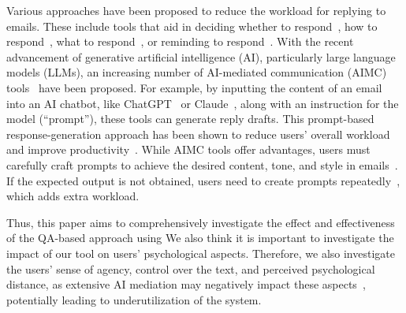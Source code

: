 Various approaches have been proposed to reduce the workload for replying to emails.
These include tools that aid in deciding whether to respond~\cite{dredze2008intelligent, di2016youvegotmail}, how to respond~\cite{vaish2017crowdtone, Respondable}, what to respond~\cite{Kannan2016Smart, Al-Alwani2013novel, Moravapalle2017DejaVuAC, Naeem2018A}, or reminding to respond~\cite{Dugan2017RemindMe:, Won2009Designing}.
With the recent advancement of generative artificial intelligence (AI), particularly large language models (LLMs), an increasing number of AI-mediated communication (AIMC) tools~\cite{ChatGPT, Grammarly, MicrosoftCopilot, bastola2024llmbasedsmartreplylsr, Claude, Foodman2022LaMPost, Fu2023Comparing, Chen2019Gmail} have been proposed.
For example, by inputting the content of an email into an AI chatbot, like ChatGPT~\cite{ChatGPT} or Claude~\cite{Claude}, along with an instruction for the model (``prompt''), these tools can generate reply drafts. 
This prompt-based response-generation approach has been shown to reduce users' overall workload and improve productivity~\cite{bastola2024llmbasedsmartreplylsr}.
While AIMC tools offer advantages, users must carefully craft prompts to achieve the desired content, tone, and style in emails~\cite{Zhou2024GlassMail}.
If the expected output is not obtained, users need to create prompts repeatedly~\cite{fu2024text}, which adds extra workload.


Thus, this paper aims to comprehensively investigate the effect and effectiveness of the QA-based approach using 
We also think it is important to investigate the impact of our tool on users' psychological aspects.
Therefore, we also investigate the users' sense of agency, control over the text, and perceived psychological distance, as extensive AI mediation may negatively impact these aspects~\cite{Fu2023Comparing, mieczkowski2022examining, Draxler2024The, Buschek2021The}, potentially leading to underutilization of the system.

